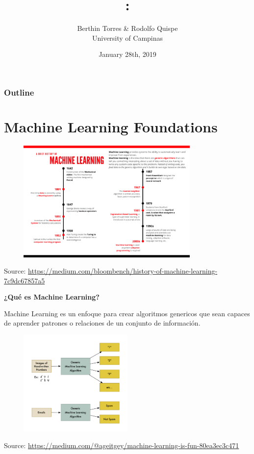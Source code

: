 \documentclass[english,svgnames,notes=hide,12pt]{beamer}
\title{\large\seminarname:\\\large\presentationtitle}
\author{Berthin Torres \& Rodolfo Quispe\\
    \small University of Campinas
}
\date{January 28th, 2019}
\begin{document}
\thispagestyle{empty}
\begin{frame}
    \titlepage
\end{frame}

\begin{frame}
    \frametitle{Outline}
    \tableofcontents
\end{frame}


\section{Machine Learning Foundations}
\begin{frame}
    \begin{figure}
        \includegraphics[width=0.8\textwidth]{imgs/machine-learning-timeline.pdf}
    \end{figure}
    \centering\tiny{Source: \url{https://medium.com/bloombench/history-of-machine-learning-7c9dc67857a5}}
\end{frame}

\begin{frame}
    \textbf{¿Qué es Machine Learning?}
    
    Machine Learning es un enfoque para crear algoritmos genericos que sean capaces de aprender patrones o relaciones de un conjunto de informaci\'on.
    \vspace{-1cm}
    \begin{figure}
        \includegraphics[width=0.5\textwidth]{imgs/sample-ml.png}
    \end{figure}
    \vspace{-.5cm}
    \centering\tiny{Source: \url{https://medium.com/@ageitgey/machine-learning-is-fun-80ea3ec3c471}}
\end{frame}
\end{document}
